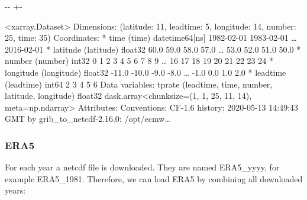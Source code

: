 \documentclass[letterpaper,10pt,english]{sphinxmanual}
\newlength\nbsphinxcodecellspacing
\begin{document}
{

\kern-\sphinxverbatimsmallskipamount\kern-\baselineskip
\kern+\FrameHeightAdjust\kern-\fboxrule
\vspace{\nbsphinxcodecellspacing}

\begin{sphinxVerbatim}[commandchars=\\\{\}]
\llap{\color{nbsphinxout}[11]:\,\hspace{\fboxrule}\hspace{\fboxsep}}<xarray.Dataset>
Dimensions:    (latitude: 11, leadtime: 5, longitude: 14, number: 25, time: 35)
Coordinates:
  * time       (time) datetime64[ns] 1982-02-01 1983-02-01 {\ldots} 2016-02-01
  * latitude   (latitude) float32 60.0 59.0 58.0 57.0 {\ldots} 53.0 52.0 51.0 50.0
  * number     (number) int32 0 1 2 3 4 5 6 7 8 9 {\ldots} 16 17 18 19 20 21 22 23 24
  * longitude  (longitude) float32 -11.0 -10.0 -9.0 -8.0 {\ldots} -1.0 0.0 1.0 2.0
  * leadtime   (leadtime) int64 2 3 4 5 6
Data variables:
    tprate     (leadtime, time, number, latitude, longitude) float32 dask.array<chunksize=(1, 1, 25, 11, 14), meta=np.ndarray>
Attributes:
    Conventions:  CF-1.6
    history:      2020-05-13 14:49:43 GMT by grib\_to\_netcdf-2.16.0: /opt/ecmw{\ldots}
\end{sphinxVerbatim}
}


\subsubsection{ERA5}
\label{\detokenize{Notebooks/2.Preprocess/2.Preprocess:ERA5}}
For each year a netcdf file is downloaded. They are named ERA5\_yyyy, for example ERA5\_1981. Therefore, we can load ERA5 by combining all downloaded years:

{
\begin{sphinxVerbatim}[commandchars=\\\{\}]
\llap{\color{nbsphinxin}[12]:\,\hspace{\fboxrule}\hspace{\fboxsep}}   
\end{sphinxVerbatim}
}
\end{document}
